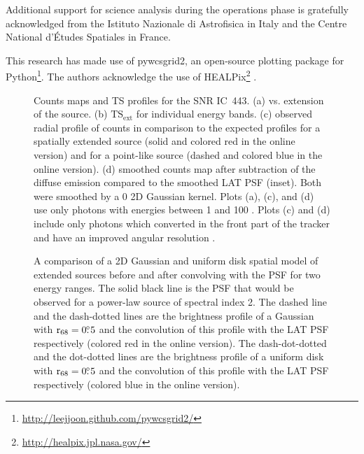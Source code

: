 \documentclass[12pt,preprint]{aastex}
\newif\ifcolorfigure
\newcommand{\gev}{\text{GeV}\xspace}
\newcommand{\tsext}{{\ensuremath{\text{TS}_{\text{ext}}}}\xspace}
\newcommand{\rsixeight}{{\ensuremath{\text{r}_{68}}}\xspace}
\newcommand{\ts}{\text{TS}\xspace}
\begin{document}
Additional support for science analysis during the operations phase is gratefully
acknowledged from the Istituto Nazionale di Astrofisica in Italy and the Centre National d'\'Etudes Spatiales in France.

This research has made use of
pywcsgrid2, an open-source plotting package for
Python\footnote{\url{http://leejjoon.github.com/pywcsgrid2/}}. The authors acknowledge the
use of HEALPix\footnote{\url{http://healpix.jpl.nasa.gov/}} \citep{healpix}.





\clearpage
\begin{figure}
    \ifcolorfigure
    \plotone{ic443_plots/four_plots_ic443_color.eps}
    \else
    \fi
    \caption{
    Counts maps and TS profiles for the SNR IC~443. (a) \ts
    vs. extension of the source. (b) \tsext for individual energy
    bands. (c) observed radial profile of counts in comparison to the
    expected profiles for a spatially extended source (solid and colored
    red in the online version) and for a point-like source (dashed and colored
    blue in the online version).  (d) smoothed counts map after subtraction
    of the diffuse emission compared to the smoothed
    LAT PSF (inset). Both were smoothed by a 0 2D Gaussian kernel.
    Plots (a),
    (c), and (d) use only 
    photons with energies between
    1 \gev and 100 \gev.  Plots (c) and (d) include
    only photons which converted in the front part of the tracker and
    have an improved angular resolution \citep{atwood_fermi}.
    }
    \label{four_plots_ic443}
\end{figure}

\clearpage
\begin{figure}
    \ifcolorfigure
      \plotone{mc_plots/compare_disk_gauss_color.eps}
    \else
    \fi
    \caption{
    A comparison of a 2D Gaussian and uniform disk spatial model
    of extended sources before and after convolving with the PSF for two
    energy ranges.  The solid black line is the PSF that would be observed
    for a power-law source of spectral index 2. The dashed line
    and the dash-dotted lines are 
    the brightness profile of a Gaussian with $\rsixeight=0\fdg5$
    and the convolution of this profile with the LAT PSF respectively
    (colored red in the online version).
    The dash-dot-dotted and the dot-dotted lines are the brightness profile
    of a uniform disk with $\rsixeight=0\fdg5$ and the convolution
    of this profile with the LAT PSF respectively (colored blue in the online version).
    }\label{compare_disk_gauss}
  \end{figure}
\end{document}
